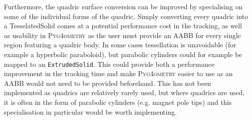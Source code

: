 \documentclass[final,5p,times,twocolumn]{elsarticle}
\newcommand{\pyinline}[1]{\lstinline[postbreak={}]{#1}}
\newcommand{\PYGEOMETRY}{\textsc{Pyg4ometry}}
\begin{document}
Furthermore, the quadric surface conversion can be improved by specialising
on some of the individual forms of the quadric.  Simply converting every
quadric into a TesselatedSolid comes at a potential performance cost in the
tracking, as well as usability in \PYGEOMETRY{} as the user must provide an
AABB for every single region featuring a quadric body.  In some cases
tessellation is unavoidable (for example a hyperbolic paraboloid), but
parabolic cylinders could for example be mapped to an \pyinline{ExtrudedSolid}.
This could provide both a performance improvement in the tracking time and
make \PYGEOMETRY{} easier to use as an AABB would not need to be provided
beforehand.  This has not been implemented as quadrics are relatively
rarely used, but where quadrics are used, it is often in the form of
parabolic cylinders (e.g. magnet pole tips) and this specialisation in
particular would be worth implementing.
\end{document}
